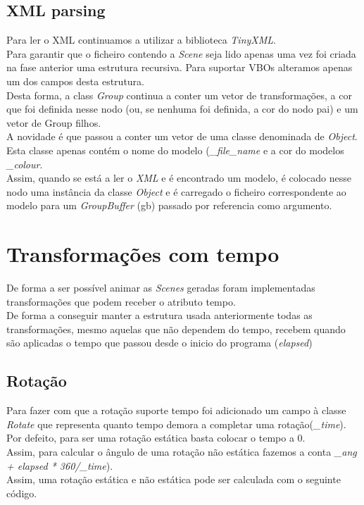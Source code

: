 \documentclass[a4paper]{report}
\begin{document}
\subsection{XML parsing}
Para ler o XML continuamos a utilizar a biblioteca \textit{TinyXML}.\\
Para garantir que o ficheiro contendo a \textit{Scene} seja lido apenas uma vez
foi criada na fase anterior uma estrutura recursiva. Para suportar VBOs
alteramos apenas um dos campos desta estrutura.\\
Desta forma, a class \textit{Group} continua a conter um vetor de
transformações, a cor que foi definida nesse nodo (ou, se nenhuma foi definida,
a cor do nodo pai) e um vetor de Group filhos.\\
A novidade é que passou a conter um vetor de uma classe denominada de
\textit{Object}. Esta classe apenas contém o nome do modelo
(\textit{\_file\_name} e a cor do modelos \textit{\_colour}.\\
Assim, quando se está a ler o \textit{XML} e é encontrado um modelo, é colocado
nesse nodo uma instância da classe \textit{Object} e é carregado o ficheiro
correspondente ao modelo para um \textit{GroupBuffer} (gb) passado por
referencia como argumento.



\section{Transformações com tempo}
De forma a ser possível animar as \textit{Scenes} geradas foram implementadas
transformações que podem receber o atributo tempo.\\
De forma a conseguir manter a estrutura usada anteriormente todas as
transformações, mesmo aquelas que não dependem do tempo, recebem quando são
aplicadas o tempo que passou desde o inicio do programa (\textit{elapsed})

\subsection{Rotação}
Para fazer com que a rotação suporte tempo foi adicionado um campo à classe
\textit{Rotate} que representa quanto tempo demora a completar uma
rotação(\textit{\_time}). Por defeito, para ser uma rotação estática basta
colocar o tempo a 0.\\
Assim, para calcular o ângulo de uma rotação não estática fazemos a conta
\textit{\_ang + elapsed * 360/\_time}).\\
Assim, uma rotação estática e não estática pode ser calculada com o seguinte
código.
\end{document}
